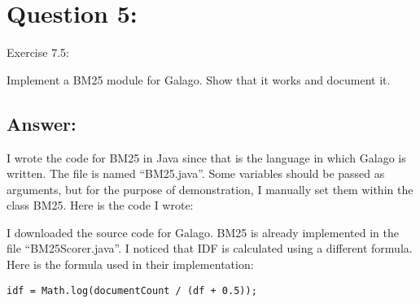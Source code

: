 \section*{Question 5:}
Exercise 7.5: 

Implement a BM25 module for Galago. Show that it works and document
it.

\subsection*{Answer:}

I wrote the code for BM25 in Java since that is the language in which Galago is written. The file is named ``BM25.java''. Some variables should be passed as arguments, but for the purpose of demonstration, I manually set them within the class BM25. Here is the code I wrote:



I downloaded the source code for Galago. BM25 is already implemented in the file ``BM25Scorer.java''. I noticed that IDF is calculated using a different formula. Here is the formula used in their implementation:

\begin{lstlisting}
idf = Math.log(documentCount / (df + 0.5)); 
\end{lstlisting}
